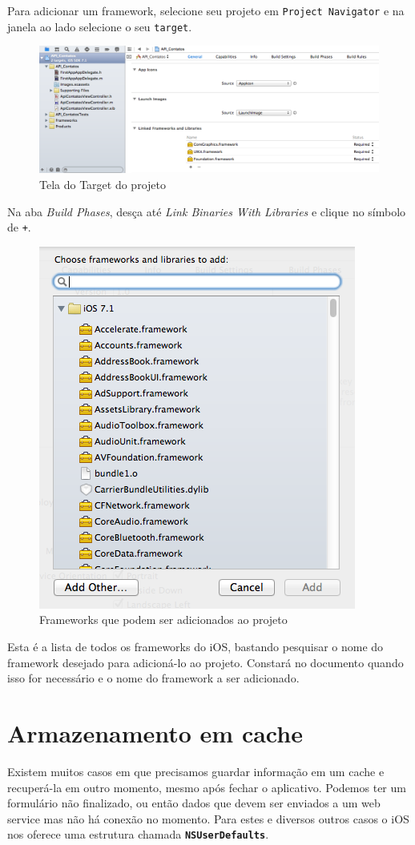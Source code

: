 \documentclass[a4paper,12pt,brazil,doubleside]{book}
\begin{document}
\begin{singlespace}
Para adicionar um framework, selecione seu projeto em \texttt{Project Navigator} e na janela ao lado selecione o seu \texttt{target}.

\begin{figure}[H]
  \centering
  \includegraphics[width=.75\textwidth]{figuras/framework3.png}
  \caption{Tela do Target do projeto}
  \label{fig:a}
\end{figure}

Na aba \emph{Build Phases}, desça até \emph{Link Binaries With Libraries} e clique no símbolo de \texttt{+}.

\begin{figure}[H]
  \centering
  \includegraphics[width=.45\textwidth]{figuras/framework4.png}
  \caption{Frameworks que podem ser adicionados ao projeto}
  \label{fig:a}
\end{figure}

Esta é a lista de todos os frameworks do iOS, bastando pesquisar o nome do framework desejado para adicioná-lo ao projeto. Constará no documento quando isso for necessário e o nome do framework a ser adicionado.

\section{Armazenamento em cache}

Existem muitos casos em que precisamos guardar informação em um cache e recuperá-la em outro momento, mesmo após fechar o aplicativo. Podemos ter um formulário não finalizado, ou então dados que devem ser enviados a um web service mas não há conexão no momento. Para estes e diversos outros casos o iOS nos oferece uma estrutura chamada \texttt{\textbf{NSUserDefaults}}.


\end{singlespace}
\end{document}
